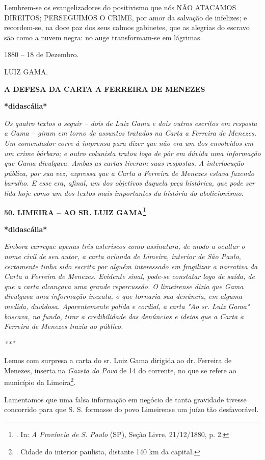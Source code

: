 Lembrem-se os evangelizadores do positivismo que nós NÃO ATACAMOS
DIREITOS; PERSEGUIMOS O CRIME, por amor da salvação de infelizes; e
recordem-se, na doce paz dos seus calmos gabinetes, que as alegrias do
escravo são como a nuvem negra: no auge transformam-se em lágrimas.

1880 -- 18 de Dezembro.

LUIZ GAMA.

\textbf{A DEFESA DA CARTA A FERREIRA DE MENEZES}

\textbf{*didascália*}

\emph{Os quatro textos a seguir -- dois de Luiz Gama e dois outros
escritos em resposta a Gama -- giram em torno de assuntos tratados na
Carta a Ferreira de Menezes. Um comendador corre à imprensa para dizer
que não era um dos envolvidos em um crime bárbaro; e outro colunista
tratou logo de pôr em dúvida uma informação que Gama divulgava. Ambas as
cartas tiveram suas respostas. A interlocução pública, por sua vez,
expressa que a Carta a Ferreira de Menezes estava fazendo barulho. E
esse era, afinal, um dos objetivos daquela peça histórica, que pode ser
lida hoje como um dos textos mais importantes da história do
abolicionismo.}

\textbf{50. LIMEIRA -- AO SR. LUIZ GAMA}\footnote{. In: \emph{A
  Província de S. Paulo} (SP), Seção Livre, 21/12/1880, p. 2.}

\textbf{*didascália*}

\emph{Embora carregue apenas três asteriscos como assinatura, de modo a
ocultar o nome civil de seu autor, a carta oriunda de Limeira, interior
de São Paulo, certamente tinha sido escrita por alguém interessado em
fragilizar a narrativa da Carta a Ferreira de Menezes. Evidente sinal,
pode-se constatar logo de saída, de que a carta alcançava uma grande
repercussão. O limeirense dizia que Gama divulgava uma informação
inexata, o que tornaria sua denúncia, em alguma medida, duvidosa.
Aparentemente polida e cordial, a carta "Ao sr. Luiz Gama" buscava, no
fundo, tirar a credibilidade das denúncias e ideias que a Carta a
Ferreira de Menezes trazia ao público. }

\emph{***}

Lemos com surpresa a carta do sr. Luiz Gama dirigida ao dr. Ferreira de
Menezes, inserta na \emph{Gazeta do Povo} de 14 do corrente, no que se
refere ao município da Limeira\footnote{. Cidade do interior paulista,
  distante 140 km da capital.}.

Lamentamos que uma falsa informação em negócio de tanta gravidade
tivesse concorrido para que S. S. formasse do povo Limeirense um juízo
tão desfavorável.

